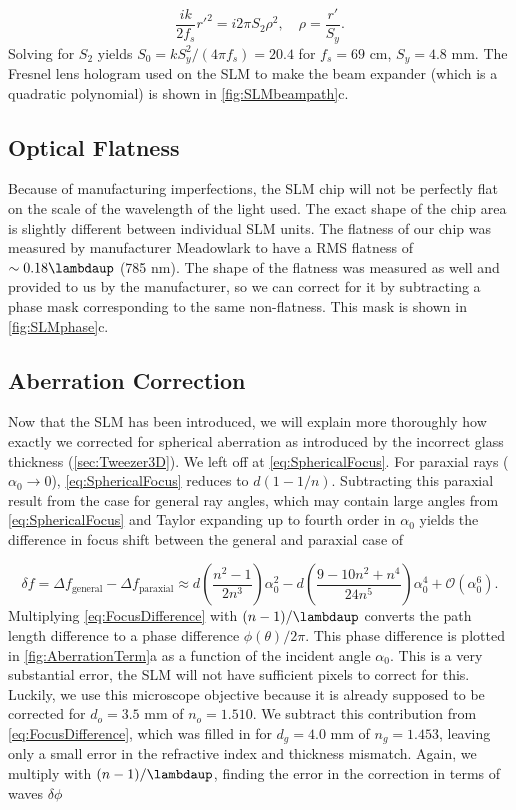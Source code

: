 \begin{equation}
    \frac{i k }{2 f_{s}}r'^2=i 2\pi S_2 \rho^2, \quad \rho = \frac{r'}{S_y}.
\end{equation}
Solving for $S_2$ yields $S_0 = k S_y^2/(4\pi f_s)= 20.4$ for $f_{s} = 69$ cm, $S_y = 4.8$ mm.
The Fresnel lens hologram used on the SLM to make the beam expander (which is a quadratic polynomial) is shown in \ref{fig:SLMbeampath}c.


\subsection{Optical Flatness}\label{subsec:Flatness}

Because of manufacturing imperfections, the SLM chip will not be perfectly flat on the scale of the wavelength of the light used. 
The exact shape of the chip area is slightly different between individual SLM units.
The flatness of our chip was measured by manufacturer Meadowlark to have a RMS flatness of $\sim 0.18\lambdaup$ (785 nm).
The shape of the flatness was measured as well and provided to us by the manufacturer, so we can correct for it by subtracting a phase mask corresponding to the same non-flatness.
This mask is shown in \ref{fig:SLMphase}c.


\subsection{Aberration Correction}\label{subsec:AberrationCorrection}

Now that the SLM has been introduced, we will explain more thoroughly how exactly we corrected for spherical aberration as introduced by the incorrect glass thickness (\cref{sec:Tweezer3D}).
We left off at \cref{eq:SphericalFocus}.
For paraxial rays ($\alpha_0 \rightarrow 0$), \cref{eq:SphericalFocus} reduces to $d(1-1/n)$. 
Subtracting this paraxial result from the case for general ray angles, which may contain large angles from \cref{eq:SphericalFocus} and Taylor expanding up to fourth order in $\alpha_0$ yields the difference in focus shift between the general and paraxial case of \cite{Iwaniuk2011}

\begin{equation}\label{eq:FocusDifference}
    \delta f= \Delta f_{\text{general}} - \Delta f_{\text{paraxial}} \approx
    d\left(\frac{n^2-1}{2n^3}\right)\alpha_0^2 - d\left(\frac{9-10n^2+n^4}{24n^5}\right)\alpha_0^4+\mathcal{O}(\alpha_0^6).
\end{equation}
Multiplying \cref{eq:FocusDifference} with $(n-1)/\lambdaup$ converts the path length difference to a phase difference $\phi(\theta)/2\pi$.
This phase difference is plotted in \cref{fig:AberrationTerm}a as a function of the incident angle $\alpha_0$.
This is a very substantial error, the SLM will not have sufficient pixels to correct for this. 
Luckily, we use this microscope objective because it is already supposed to be corrected for $d_o=3.5$ mm of $n_o=1.510$. 
We subtract this contribution from \cref{eq:FocusDifference}, which was filled in for $d_g=4.0$ mm of $n_g=1.453$, leaving only a small error in the refractive index and thickness mismatch.
Again, we multiply with $(n-1)/\lambdaup$, finding the error in the correction in terms of waves $\delta \phi$

